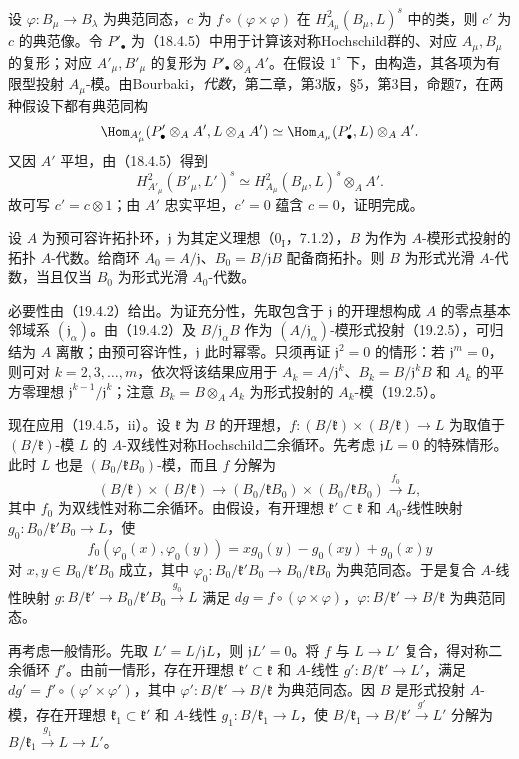 设 $\varphi:B_\mu\to B_\lambda$ 为典范同态，$c$ 为 $f\circ(\varphi\times\varphi)$ 在 $H^2_{A_\mu}(B_\mu,L)^s$ 中的类，则 $c'$ 为 $c$ 的典范像。令 $P'_\bullet$ 为（18.4.5）中用于计算该对称Hochschild群的、对应 $A_\mu,B_\mu$ 的复形；对应 $A'_\mu,B'_\mu$ 的复形为 $P'_\bullet\otimes_AA'$。在假设 $1^\circ$ 下，由构造，其各项为有限型投射 $A_\mu$-模。由Bourbaki，\textit{代数}，第二章，第3版，§5，第3目，命题7，在两种假设下都有典范同构
\[
 \Hom_{A'_\mu}(P'_\bullet\otimes_AA',L\otimes_AA')
 \simeq\Hom_{A_\mu}(P'_\bullet,L)\otimes_AA'.
\]
又因 $A'$ 平坦，由（18.4.5）得到
\[
 H^2_{A'_\mu}(B'_\mu,L')^s
 \simeq H^2_{A_\mu}(B_\mu,L)^s\otimes_AA'.
\]
故可写 $c'=c\otimes1$；由 $A'$ 忠实平坦，$c'=0$ 蕴含 $c=0$，证明完成。

设 $A$ 为预可容许拓扑环，$\mathfrak j$ 为其定义理想（$0_{\mathrm I}$，7.1.2），$B$ 为作为 $A$-模形式投射的拓扑 $A$-代数。给商环 $A_0=A/\mathfrak j$、$B_0=B/\mathfrak jB$ 配备商拓扑。则 $B$ 为形式光滑 $A$-代数，当且仅当 $B_0$ 为形式光滑 $A_0$-代数。

必要性由（19.4.2）给出。为证充分性，先取包含于 $\mathfrak j$ 的开理想构成 $A$ 的零点基本邻域系 $(\mathfrak j_\alpha)$。由（19.4.2）及 $B/\mathfrak j_\alpha B$ 作为 $(A/\mathfrak j_\alpha)$-模形式投射（19.2.5），可归结为 $A$ 离散；由预可容许性，$\mathfrak j$ 此时幂零。只须再证 $\mathfrak j^2=0$ 的情形：若 $\mathfrak j^m=0$，则可对 $k=2,3,\ldots,m$，依次将该结果应用于
$A_k=A/\mathfrak j^k$、$B_k=B/\mathfrak j^kB$ 和 $A_k$ 的平方零理想 $\mathfrak j^{k-1}/\mathfrak j^k$；注意 $B_k=B\otimes_AA_k$ 为形式投射的 $A_k$-模（19.2.5）。

现在应用（19.4.5，ii）。设 $\mathfrak k$ 为 $B$ 的开理想，$f:(B/\mathfrak k)\times(B/\mathfrak k)\to L$ 为取值于 $(B/\mathfrak k)$-模 $L$ 的 $A$-双线性对称Hochschild二余循环。先考虑 $\mathfrak jL=0$ 的特殊情形。此时 $L$ 也是 $(B_0/\mathfrak kB_0)$-模，而且 $f$ 分解为
\[
 (B/\mathfrak k)\times(B/\mathfrak k)
 \longrightarrow(B_0/\mathfrak kB_0)\times(B_0/\mathfrak kB_0)
 \xrightarrow{f_0}L,
\]
其中 $f_0$ 为双线性对称二余循环。由假设，有开理想 $\mathfrak k'\subset\mathfrak k$ 和 $A_0$-线性映射 $g_0:B_0/\mathfrak k'B_0\to L$，使
\[
 f_0(\varphi_0(x),\varphi_0(y))=xg_0(y)-g_0(xy)+g_0(x)y
\]
对 $x,y\in B_0/\mathfrak k'B_0$ 成立，其中 $\varphi_0:B_0/\mathfrak k'B_0\to B_0/\mathfrak kB_0$ 为典范同态。于是复合 $A$-线性映射 $g:B/\mathfrak k'\to B_0/\mathfrak k'B_0\xrightarrow{g_0}L$ 满足 $dg=f\circ(\varphi\times\varphi)$，$\varphi:B/\mathfrak k'\to B/\mathfrak k$ 为典范同态。

再考虑一般情形。先取 $L'=L/\mathfrak jL$，则 $\mathfrak jL'=0$。将 $f$ 与 $L\to L'$ 复合，得对称二余循环 $f'$。由前一情形，存在开理想 $\mathfrak k'\subset\mathfrak k$ 和 $A$-线性 $g':B/\mathfrak k'\to L'$，满足 $dg'=f'\circ(\varphi'\times\varphi')$，其中 $\varphi':B/\mathfrak k'\to B/\mathfrak k$ 为典范同态。因 $B$ 是形式投射 $A$-模，存在开理想 $\mathfrak k_1\subset\mathfrak k'$ 和 $A$-线性 $g_1:B/\mathfrak k_1\to L$，使 $B/\mathfrak k_1\to B/\mathfrak k'\xrightarrow{g'}L'$ 分解为 $B/\mathfrak k_1\xrightarrow{g_1}L\to L'$。

